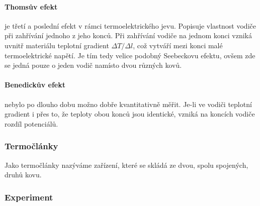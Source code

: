 \paragraph{Thomsův efekt} je třetí a poslední efekt v rámci termoelektrického
jevu.  Popisuje vlastnost vodiče při zahřívání jednoho z jeho konců. Při
zahřívání vodiče na jednom konci vzniká uvnitř materiálu teplotní gradient
$\Delta T/\Delta l$, což vytváří mezi konci malé termoelektrické napětí. Je tím
tedy velice podobný Seebeckovu efektu, ovšem zde se jedná pouze o jeden vodič
namísto dvou různých kovů. \cite{jreichl-thomson}

\paragraph{Benedickův efekt} nebylo po dlouho dobu možno dobře kvantitativně
měřit.  Je-li ve vodiči teplotní gradient i přes to, že teploty obou konců jsou
identické, vzniká na koncích vodiče rozdíl potenciálů.

\subsubsection{Termočlánky}
Jako termočlánky nazýváme zařízení, které se skládá ze dvou, spolu spojených,
druhů kovu. 


\subsubsection{Experiment}

